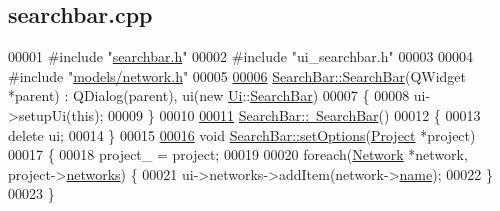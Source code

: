 \hypertarget{searchbar_8cpp_source}{}\subsection{searchbar.\+cpp}
\label{searchbar_8cpp_source}

\begin{DoxyCode}
00001 \textcolor{preprocessor}{#include "\hyperlink{searchbar_8h}{searchbar.h}"}
00002 \textcolor{preprocessor}{#include "ui\_searchbar.h"}
00003 
00004 \textcolor{preprocessor}{#include "\hyperlink{network_8h}{models/network.h}"}
00005 
\hypertarget{searchbar_8cpp_source_l00006}{}\hyperlink{class_search_bar_a75f8caf009094148f56149b00996ac84}{00006} \hyperlink{class_search_bar_a75f8caf009094148f56149b00996ac84}{SearchBar::SearchBar}(QWidget *parent) : QDialog(parent), ui(new 
      \hyperlink{namespace_ui}{Ui}::\hyperlink{class_search_bar}{SearchBar})
00007 \{
00008   ui->setupUi(\textcolor{keyword}{this});
00009 \}
00010 
\hypertarget{searchbar_8cpp_source_l00011}{}\hyperlink{class_search_bar_a553f2c7b9c15e7ae39cf988a6ef8f786}{00011} \hyperlink{class_search_bar_a553f2c7b9c15e7ae39cf988a6ef8f786}{SearchBar::~SearchBar}()
00012 \{
00013   \textcolor{keyword}{delete} ui;
00014 \}
00015 
\hypertarget{searchbar_8cpp_source_l00016}{}\hyperlink{class_search_bar_a840eb8fbdea559d31a7c2af6a4cbc480}{00016} \textcolor{keywordtype}{void} \hyperlink{class_search_bar_a840eb8fbdea559d31a7c2af6a4cbc480}{SearchBar::setOptions}(\hyperlink{class_project}{Project} *project)
00017 \{
00018   project\_ = project;
00019 
00020   \textcolor{keywordflow}{foreach}(\hyperlink{class_network}{Network} *network, project->\hyperlink{class_project_aa98126154cab59769a431668e6f17daf}{networks}) \{
00021     ui->networks->addItem(network->\hyperlink{class_network_ab6643733a517f930c60b06f5ffd78186}{name});
00022   \}
00023 \}
\end{DoxyCode}
